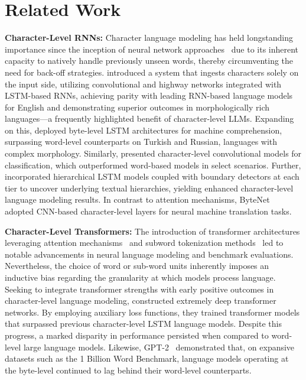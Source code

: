 \section{Related Work}
\label{section:related_work}

\textbf{Character-Level RNNs:} Character language modeling has held longstanding importance since the inception of neural network approaches~\citep{sutskever2011generating,mikolov2012subword,graves2013generating} due to its inherent capacity to natively handle previously unseen words, thereby circumventing the need for back-off strategies. \cite{kim2016character} introduced a system that ingests characters solely on the input side, utilizing convolutional and highway networks integrated with LSTM-based RNNs, achieving parity with leading RNN-based language models for English and demonstrating superior outcomes in morphologically rich languages—a frequently highlighted benefit of character-level LLMs. Expanding on this, \cite{kenter2018byte} deployed byte-level LSTM architectures for machine comprehension, surpassing word-level counterparts on Turkish and Russian, languages with complex morphology. Similarly, \cite{zhang2015character} presented character-level convolutional models for classification, which outperformed word-based models in select scenarios. Further, \citet{chung2019hierarchical} incorporated hierarchical LSTM models coupled with boundary detectors at each tier to uncover underlying textual hierarchies, yielding enhanced character-level language modeling results. In contrast to attention mechanisms, ByteNet~\citep{kalchbrenner2016neural} adopted CNN-based character-level layers for neural machine translation tasks.

\textbf{Character-Level Transformers:} The introduction of transformer architectures leveraging attention mechanisms~\citep{vaswani2017attention} and subword tokenization methods~\citep{sennrich-etal-2016-neural} led to notable advancements in neural language modeling and benchmark evaluations. Nevertheless, the choice of word or sub-word units inherently imposes an inductive bias regarding the granularity at which models process language. Seeking to integrate transformer strengths with early positive outcomes in character-level language modeling, \citet{al2019character} constructed extremely deep transformer networks. By employing auxiliary loss functions, they trained transformer models that surpassed previous character-level LSTM language models. Despite this progress, a marked disparity in performance persisted when compared to word-level large language models. Likewise, GPT-2~\citep{radfordgpt2} demonstrated that, on expansive datasets such as the 1 Billion Word Benchmark, language models operating at the byte-level continued to lag behind their word-level counterparts.

